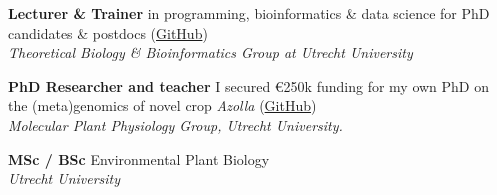 \documentclass[a4paper,10pt]{article}
\begin{document}
{\begin{adjustbox}{valign=t}
\begin{minipage}[t]{0.3\textwidth}
\begin{spacing}{1}
\begin{itemize}
\end{itemize}
\end{spacing}


\end{minipage}%
\end{adjustbox}%
\hfill%


\begin{adjustbox}{valign=t}
\hfill%
\begin{minipage}[t]{0.05\textwidth}
\MyVerticalRule
\end{minipage}%
\end{adjustbox}

\begin{adjustbox}{valign=t}
\hfill%
\begin{minipage}[t]{0.6\textwidth}


\begin{description}
\raggedright
  \item[\normalfont \textcolor{ForestGreen}{\textbf{2022 -- now.}}] \textbf{Lecturer \&  Trainer} 
    in programming, bioinformatics \& data science for PhD candidates \& postdocs 
    (\href{https://github.com/lauralwd/professional_education}{GitHub})\\
    \textit{Theoretical Biology \& Bioinformatics Group at Utrecht University}
  \item[\normalfont \textcolor{ForestGreen}{\textbf{2017 -- 2022.}}] \textbf{PhD Researcher and teacher} 
    I secured €250k funding for my own PhD on the (meta)genomics of novel crop \textit{Azolla} 
    (\href{https://github.com/lauralwd/azolla_phd_thesis}{GitHub})\\ 
    \textit{Molecular Plant Physiology Group, Utrecht University.}
  \item[\normalfont \textcolor{ForestGreen}{\textbf{2010 -- 2017.}}] \textbf{MSc / BSc} Environmental Plant Biology \\
    \textit{Utrecht University}
\end{description}



\end{minipage}
\end{adjustbox}}
\end{document}
